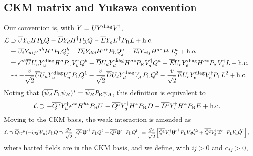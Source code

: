 \documentclass[CheatSheet]{subfiles}
\begin{document}
\subsection{CKM matrix and Yukawa convention}\label{sec:SM-CKM}
Our convention is, with  $Y=UY\wdiag V^\dagger$,
\begin{align}
  \mathcal L&\supset
  \overline{U}\Yu H \PL Q
- \overline{D}\Yd H^\dagger \PR Q
- \overline{E}\Ye H^\dagger \PR L + \text{h.c.}
\\&=
  \overline{U_i}\Yu[ij] \epsilon^{ab}H^a \PL Q_j^b
- \overline{D_i}\Yd[ij] H^{a*} \PL Q_j^a
- \overline{E_i}\Ye[ij] H^{a*} \PL L_j^a + \text{h.c.}
\\&=
  \epsilon^{ab}\overline{U}U_u\Yu\wdiag H^a \PL V_u^\dagger Q^b
- \overline{D}U_d\Yd\wdiag H^{a*} \PR V_d^\dagger Q^a
- \overline{E}U_e\Ye\wdiag H^{a*} \PR V_e^\dagger L + \text{h.c.}
\\&\leadsto
  -\frac{v}{\sqrt2}\overline{U}U_u\Yu\wdiag V_u^\dagger\PL Q^1
  -\frac{v}{\sqrt2}\overline{D}U_d\Yd\wdiag V_d^\dagger\PL Q^2
  -\frac{v}{\sqrt2}\overline{E}U_e\Ye\wdiag V_e^\dagger\PL L^2 + \text{h.c.}
\end{align}
Noting that $(\overline{\psi_A}\PL\psi_B)^*=\overline{\psi_B}\PR\psi_A$, this definition is equivalent to
\begin{equation}
   \mathcal L\supset
- \overline{Q^a}\Yu^\dagger \epsilon^{ab}H^{b*} \PR U
- \overline{Q^a}\Yd^\dagger H^{a} \PR D
- \overline{L^a}\Ye^\dagger H^{a} \PR E + \text{h.c.}
\end{equation}
Moving to the CKM basis, the weak interaction is amended as
\begin{equation}
 \mathcal L\supset\overline{Q}\ii\gamma^\mu(-\ii g_2 W_\mu)\PL Q
\supset
\frac{g_2}{\sqrt2}\left[
\overline{Q^1} \slashed W^+\PL Q^2
+\overline{Q^2}\slashed W^-\PL Q^1
\right]
=
\frac{g_2}{\sqrt2}\left[
\overline{\hat Q^1} V_u^\dagger\slashed W^+\PL V_d \hat Q^2
+\overline{\hat Q^2}V_d^\dagger\slashed W^-\PL V_u \hat Q^1
\right],
\end{equation}
where hatted fields are in the CKM basis, and we define, with $\si{ij}>0$ and $\co{ij}>0$,
\end{document}
